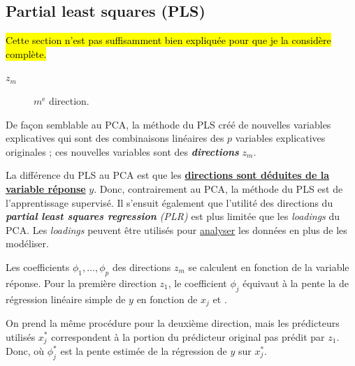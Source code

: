\documentclass[french]{article}
\begin{document}
\begin{multicols*}{2}
\columnbreak
\subsection{Partial least squares (PLS)}
\hl{Cette section n'est pas suffisamment bien expliquée pour que je la considère complète.}

\begin{distributions}[Notation]
\begin{description}
	\item[$z_{m}$]	$m^{\text{e}}$ direction. 
\end{description}
\end{distributions}

\begin{rappel_enhanced}[Contexte]
De façon semblable au PCA, la méthode du PLS créé de nouvelles variables explicatives qui sont des combinaisons linéaires des $p$ variables explicatives originales ; ces nouvelles variables sont des \og \textit{\textbf{directions}} \fg{} $z_{m}$. 

\bigskip

La différence du PLS au PCA est que les \textbf{\underline{directions sont déduites de la variable réponse}} $y$. Donc, contrairement au PCA, la méthode du PLS est de l'apprentissage supervisé. Il s'ensuit également que l'utilité des directions du \og \textit{\textbf{partial least squares regression} (PLR)} \fg{} est plus limitée que les \og \textit{loadings} \fg{} du PCA. Les \og \textit{loadings} \fg{} peuvent être utilisés pour \underline{analyser} les données en plus de les modéliser.
\end{rappel_enhanced}

\begin{definitionNOHFILLsub}[Coefficients]
Les coefficients $\phi_{1}, \dots, \phi_{p}$ des directions $z_{m}$ se calculent en fonction de la variable réponse. Pour la première direction $z_{1}$, le coefficient $\phi_{j}$ équivaut à la pente la de régression linéaire simple de $y$ en fonction de $x_{j}$ et . 

\bigskip

On prend la même procédure pour la deuxième direction, mais les prédicteurs utilisés $x_{j}^{\ast}$ correspondent à la portion du prédicteur original pas prédit par $z_{1}$. Donc,   où $\phi_{j}^{\ast}$ est la pente estimée de la régression de $y$ sur $x^{\ast}_{j}$.


\end{definitionNOHFILLsub}
\end{multicols*}
\end{document}
